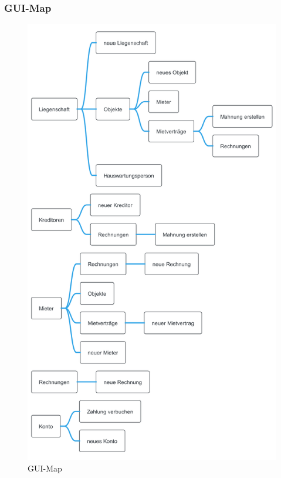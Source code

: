 \subsubsection{GUI-Map}
\vspace*{-1cm}
\begin{figure}[H]
  \begin{center}
    \includegraphics[height=0.9\textheight]{content/diagrams/out/guiMap/GuiMindMap.png}
    \caption{GUI-Map}
    \label{guiMap}
  \end{center}
\end{figure}

